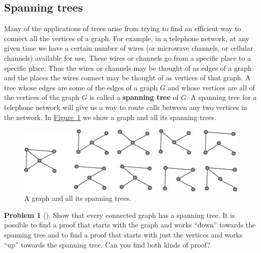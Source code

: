 \documentclass[10pt,]{book}
\newcommand{\terminology}[1]{\textbf{#1}}
\theoremstyle{plain}
\theoremstyle{definition}
\newtheorem{activity}[project]{Problem}
\theoremstyle{definition}
\numberwithin{equation}{chapter}
\begin{document}
\subsection[{Spanning trees}]{Spanning trees}\label{subsection-24}
Many of the applications of trees arise from trying to find an efficient way to connect all the vertices of a graph. For example, in a telephone network, at any given time we have a certain number of wires (or microwave channels, or cellular channels) available for use. These wires or channels go from a specific place to a specific place. Thus the wires or channels may be thought of as edges of a graph and the places the wires connect may be thought of as vertices of that graph. A tree whose edges are some of the edges of a graph \(G\) and whose vertices are all of the vertices of the graph \(G\) is called a \terminology{spanning tree} of \(G\). A spanning tree for a telephone network will give us a way to route calls between any two vertices in the network. In \hyperref[spanningtrees]{Figure~\ref{spanningtrees}} we show a graph and all its spanning trees.%
\begin{figure}
\centering
\includegraphics[width=0.95\linewidth]{images/spanningtrees}
\caption{A graph and all its spanning trees.\label{spanningtrees}}
\end{figure}
\begin{activity}[]\marginsymbol[-1em]{} \label{activity-117}
Show that every connected graph has a spanning tree. It is possible to find a proof that starts with the graph and works ``down'' towards the spanning tree and to find a proof that starts with just the vertices and works ``up'' towards the spanning tree. Can you find both kinds of proof?%
\end{activity}
\typeout{************************************************}
\typeout{************************************************}
\end{document}

